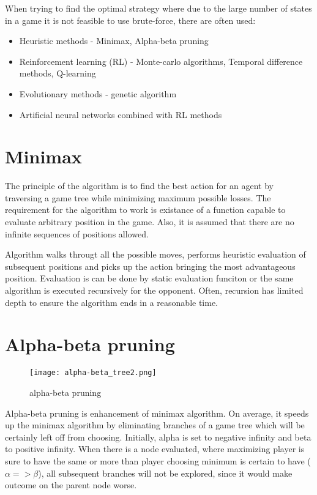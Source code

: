 When trying to find the optimal strategy where due to the large number
of states in a game it is not feasible to use brute-force, there are often
used:
\begin{itemize}
  \vspace*{-0.25cm}
  \setlength\itemsep{0cm}
  \item Heuristic methods - Minimax, Alpha-beta pruning
  \item Reinforcement learning (RL) - Monte-carlo algorithms,
                                      Temporal difference methods, Q-learning
  \item Evolutionary methods - genetic algorithm
  \item Artificial neural networks combined with RL methods
  \vspace*{-0.15cm}
\end{itemize}

\section{Minimax}
The principle of the algorithm is to find the best action for an agent by
traversing a game tree while minimizing maximum possible losses.
The requirement for the algorithm to work is existance of a function capable to
evaluate arbitrary position in the game. Also, it is assumed that there are no
infinite sequences of positions allowed.

Algorithm walks througt all the possible moves, performs heuristic evaluation
of subsequent positions and picks up the action bringing the most advantageous
position. Evaluation is can be done by static evaluation funciton or the same
algorithm is executed recursively for the opponent. Often, recursion has
limited depth to ensure the algorithm ends in a reasonable time.

\section{Alpha-beta pruning}
\begin{wrapfigure}{r}{0.5\textwidth}
  \vspace*{-2.85cm}
  \centering
  \texttt{[image: alpha-beta\_tree2.png]}
  \vspace*{-0.85cm}
  \caption{alpha-beta pruning}
  \label{fig:abp}
  \vspace*{-0.60cm}
\end{wrapfigure}

Alpha-beta pruning is enhancement of minimax algorithm. On average, it
speeds up the minimax algorithm by eliminating branches of a game tree which
will be certainly left off from choosing. Initially, alpha is set to negative
infinity and beta to positive infinity. When there is a node evaluated, where
maximizing player is sure to have the same or more than player choosing
minimum is certain to have ($\alpha{=>}\beta$), all subsequent branches will
not be explored, since it would make outcome on the parent node worse.


